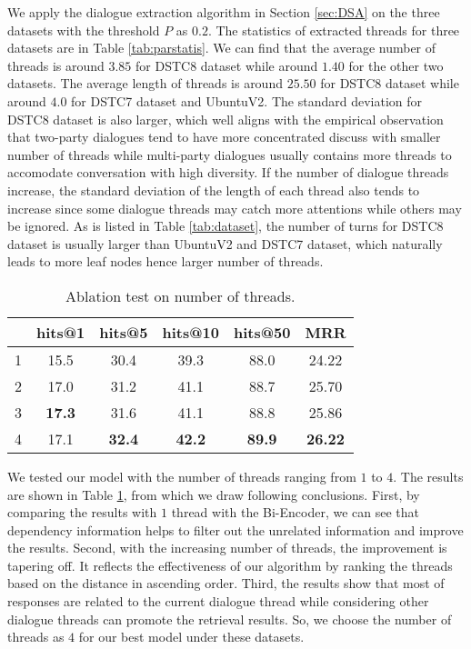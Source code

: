 We apply the dialogue extraction algorithm in Section \ref{sec:DSA} on the three datasets with the threshold $P$ as $0.2$. The statistics of extracted threads for three datasets are in Table \ref{tab:parstatis}. We can find that the average number of threads is around $3.85$ for DSTC8 dataset while around $1.40$ for the other two datasets. The average length of threads is around $25.50$ for DSTC8 dataset while around $4.0$ for DSTC7 dataset and UbuntuV2. The standard deviation for DSTC8 dataset is also larger, which well aligns with the empirical observation that two-party dialogues tend to have more concentrated discuss with smaller number of threads while multi-party dialogues usually contains more threads to accomodate conversation with high diversity. If the number of dialogue threads increase, the standard deviation of the length of each thread also tends to increase since some dialogue threads may catch more attentions while others may be ignored. As is listed in Table \ref{tab:dataset}, the number of turns for DSTC8 dataset is usually larger than UbuntuV2 and DSTC7 dataset, which naturally leads to more leaf nodes hence larger number of threads.

\begin{table}[th]
	\centering
	\scriptsize
	\begin{tabular}{lccccc}
		\toprule[1pt]
		&  hits@1 &hits@5& hits@10 & hits@50 & MRR \\
		\midrule[1pt]
		1 & 15.5 & 30.4 & 39.3 & 88.0 & 24.22 \\
		2 & 17.0 & 31.2 & 41.1 & 88.7 & 25.70 \\
		3 & \bf 17.3 & 31.6 & 41.1 & 88.8 & 25.86 \\
		4 & 17.1 & \bf 32.4 & \bf 42.2 & \bf 89.9 & \bf 26.22 \\
		\bottomrule[1pt]
	\end{tabular}
	\caption{Ablation test on number of threads.}
	\label{tab:abl_num}
\end{table}
We tested our model with the number of threads ranging from $1$ to $4$. The results are shown in Table \ref{tab:abl_num}, from which we draw following conclusions. First, by comparing the results with $1$ thread with the Bi-Encoder, we can see that dependency information helps to filter out the unrelated information and improve the results. Second, with the increasing number of threads, the improvement is tapering off. It reflects the effectiveness of our algorithm by ranking the threads based on the distance in ascending order. Third, the results show that most of responses are related to the current dialogue thread while considering other dialogue threads can promote the retrieval results. So, we choose the number of threads as $4$ for our best model under these datasets.


